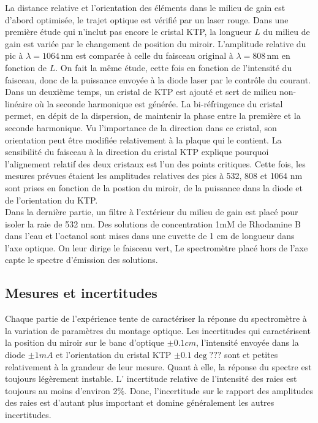 \documentclass[10pt,letterpaper,twocolumn]{article}
\begin{document}
La distance relative et l'orientation des éléments  dans le milieu de gain est d'abord optimisée, le trajet optique est vérifié par un laser rouge.  Dans une première étude qui n'inclut pas encore le cristal KTP, la longueur $L$ du milieu de gain est variée par le changement de position du miroir. L'amplitude relative du pic à $\lambda= 1064 \, \text{nm}$ est comparée à celle du faisceau original à $\lambda = 808 \, \text{nm}$ en fonction de $L$. On fait la même étude, cette fois en fonction de l'intensité du faisceau, donc de la puissance envoyée  à la diode laser par le contrôle du courant.\\

Dans un deuxième temps, un cristal de KTP est ajouté et sert de milieu non-linéaire où la seconde harmonique est générée. La bi-réfringence du cristal permet, en dépit de la dispersion, de maintenir la phase entre la première et la seconde harmonique. Vu l'importance de la direction dans ce cristal, son orientation peut être modifiée relativement à la plaque qui le contient. La sensibilité du faisceau à la direction du cristal KTP explique pourquoi l'alignement relatif des deux cristaux est l'un des points critiques. Cette fois, les mesures prévues étaient les amplitudes relatives des pics à 532, 808 et 1064 nm sont prises en fonction de la postion du miroir, de la puissance dans la diode et de l'orientation du KTP.\\

Dans la dernière partie, un filtre à l'extérieur du milieu de gain est placé pour isoler la raie de 532 nm. Des solutions de concentration 1mM de Rhodamine B dans l'eau et l'octanol sont mises dans une cuvette de 1 cm de longueur dans l'axe optique. On leur dirige le faisceau vert, Le spectromètre placé hors de l'axe  capte le spectre d'émission des solutions. \\

\subsection{Mesures et incertitudes}
Chaque partie de l'expérience tente de caractériser la réponse du spectromètre à la variation de paramètres du montage optique. Les incertitudes qui caractérisent la position du miroir sur le banc d'optique $\pm 0.1 cm$, l'intensité envoyée dans la diode $\pm 1 mA$ et l'orientation du cristal KTP $\pm 0.1 \deg???$ sont et petites relativement à la grandeur de leur mesure. Quant à elle, la réponse du spectre est toujours légèrement instable. L'  incertitude relative de l'intensité des raies est toujours au moins d'environ 2\%. Donc, l'incertitude sur le rapport des amplitudes des raies est d'autant plus important et domine généralement les autres incertitudes.\\
\end{document}
